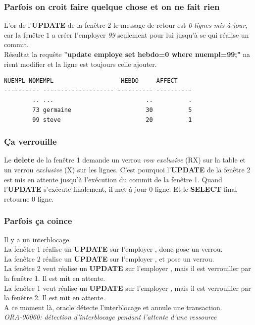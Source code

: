 \documentclass{article}
\begin{document}
\subsubsection{Parfois on croit faire quelque chose et on ne fait rien}
L'or de l'\textbf{UPDATE} de la fenêtre 2 le message de retour est \textit{0 lignes mis à jour}, car la fenêtre 1 a créer l'employer \textit{99} seulement pour lui jusqu'à se qui réalise un commit.
\\
Résultat la requête \textbf{"update employe set hebdo=0 where nuempl=99;"} na rient modifier et la ligne est toujours celle ajouter.
\begin{lstlisting}[caption= select * from employe;]
    NUEMPL NOMEMPL                   HEBDO     AFFECT
---------- -------------------- ---------- ----------
        .. ...                          ..          .
        73 germaine                     30          5
        99 steve                        20          1
\end{lstlisting}

\subsubsection{Ça verrouille}
Le \textbf{delete} de la fenêtre 1 demande un verrou \textit{row exclusive} (RX) sur la table et un verrou \textit{exclusive} (X) sur les lignes. C'est pourquoi l'\textbf{UPDATE} de la fenêtre 2 est mis en attente jusqu'à l'exécution du commit de la fenêtre 1. Quand l'\textbf{UPDATE} s'exécute finalement, il met à jour 0 ligne. Et le \textbf{SELECT} final retourne 0 ligne.

\subsubsection{Parfois ça coince}
Il y a un interblocage.
\\
La fenêtre 1 réalise un \textbf{UPDATE} sur l'employer , donc pose un verrou.
\\
La fenêtre 2 réalise un \textbf{UPDATE} sur l'employer , et pose un verrou.
\\
La fenêtre 2 veut réalise un \textbf{UPDATE} sur l'employer , mais il est verrouiller par la fenêtre 1. Il est mit en attente.
\\
La fenêtre 1 veut réalise un \textbf{UPDATE} sur l'employer , mais il est verrouiller par la fenêtre 2. Il est mit en attente.
\\
A ce moment là, oracle détecte l'interblocage et annule une transaction.
\\
\textit{ORA-00060: détection d'interblocage pendant l'attente d'une ressource}
\end{document}
